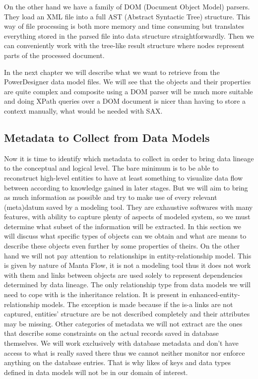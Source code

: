 On the other hand we have a family of DOM (Document Object Model) parsers. They load an XML file into a full AST (Abstract Syntactic Tree) structure. This way of file processing is both more memory and time consuming but translates everything stored in the parsed file into data structure straightforwardly. Then we can conveniently work with the tree-like result structure where nodes represent parts of the processed document.

In the next chapter we will describe what we want to retrieve from the PowerDesigner data model files. We will see that the objects and their properties are quite complex and composite using a DOM parser will be much more suitable and doing XPath queries over a DOM document is nicer than having to store a context manually, what would be needed with SAX.


\subsection{Metadata to Collect from Data Models}

Now it is time to identify which metadata to collect in order to bring data lineage to the conceptual and logical level.
The bare minimum is to be able to reconstruct high-level entities to have at least something to visualize data flow between according to knowledge gained in later stages.
But we will aim to bring as much information as possible and try to make use of every relevant (meta)datum saved by a modeling tool. They are exhaustive softwares with many features, with ability to capture plenty of aspects of modeled system, so we must determine what subset of the information will be extracted.
In this section we will discuss what specific types of objects can we obtain and what are means to describe these objects even further by some properties of theirs. 
On the other hand we will not pay attention to relationships in entity-relationship model. This is given by nature of Manta Flow, it is not a modeling tool thus it does not work with them and links between objects are used solely to represent dependencies determined by data lineage.
The only relationship type from data models we will need to cope with is the inheritance relation. It is present in enhanced-entity-relationship models. The exception is made because if the is-a links are not captured, entities' structure are be not described completely and their attributes may be missing.
Other categories of metadata we will not extract are the ones that describe some constraints on the actual records saved in database themselves. We will work exclusively with database metadata and don't have access to what is really saved there thus we cannot neither monitor nor enforce anything on the database entries. That is why likes of keys and data types defined in data models will not be in our domain of interest.

